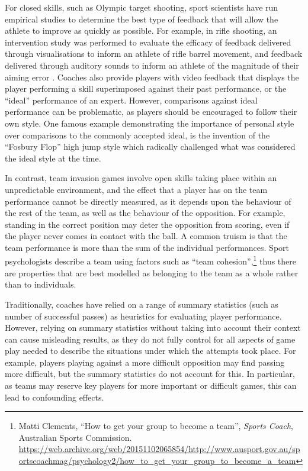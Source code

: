 For closed skills, such as Olympic target shooting, sport scientists
have run empirical studies to determine the best type of feedback that
will allow the athlete to improve as quickly as possible. For example,
in rifle shooting, an intervention study was performed to evaluate the
efficacy of feedback delivered through visualisations to inform an
athlete of rifle barrel movement, and feedback delivered through
auditory sounds to inform an athlete of the magnitude of their aiming
error \cite{mononen2017}. Coaches also provide players with
video feedback that displays the player performing a skill superimposed
against their past performance, or the ``ideal'' performance of an
expert. However, comparisons against ideal performance can be
problematic, as players should be encouraged to follow their own style.
One famous example demonstrating the importance of personal style over
comparisons to the commonly accepted ideal, is the invention of the
``Fosbury Flop'' \cite{bar-eli_developing_2006} high jump style which
radically challenged what was considered the ideal style at the time.


In contrast, team invasion games \cite{Werner1996} involve open skills \cite{Wrisberg2007} taking place within an unpredictable environment, and the effect that a player has on the team
performance cannot be directly measured, as it depends upon the behaviour
of the rest of the team, as well as the behaviour of the opposition. For
example, standing in the correct position may deter the opposition from
scoring, even if the player never comes in contact with the ball. A
common truism is that the team performance is more than the sum of the
individual performances. Sport psychologists describe a team using
factors such as ``team cohesion'',\footnote{Matti Clements, ``How to get your group to become a team'', \textit{Sports Coach}, %
Australian Sports Commission. %
\url{https://web.archive.org/web/20151102065854/http://www.ausport.gov.au/sportscoachmag/psychology2/how_to_get_your_group_to_become_a_team}}
thus there are properties that are best modelled as belonging
to the team as a whole rather than to individuals.

Traditionally, coaches have relied on a range of summary statistics (such as number of
successful passes) as heuristics for evaluating player performance.
However, relying on summary statistics without taking into account their context can cause misleading results, as they do not fully control for all aspects of game play needed to describe the situations under which the attempts
took place. For example, players playing against a more difficult opposition may find passing more difficult, but the summary statistics do not account for this. In particular, as teams may reserve key players for more important or difficult games, this can lead to confounding effects.

